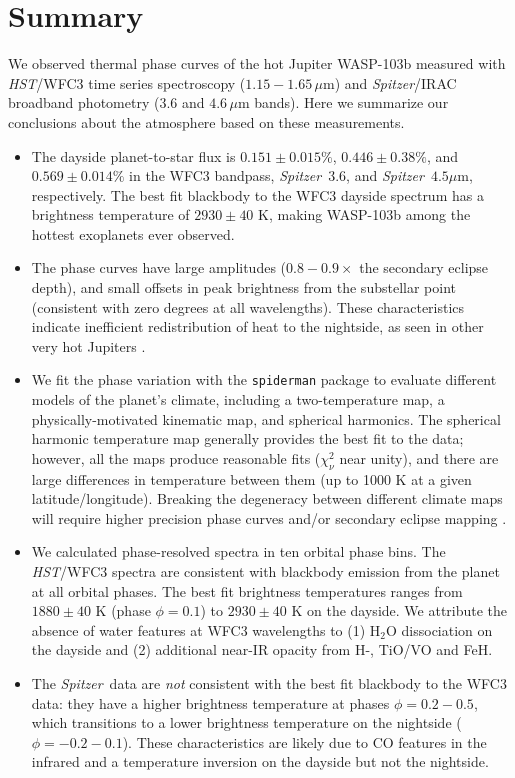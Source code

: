 \documentclass[twocolumn]{aastex61}
\newcommand{\project}[1]{\textsl{#1}}
\newcommand{\HST}{\project{HST}}
\newcommand{\Spitzer}{\project{Spitzer}}
\begin{document}
\section{Summary}
\label{sec:summary}
We observed thermal phase curves of the hot Jupiter WASP-103b measured with \HST/WFC3 time series spectroscopy ($1.15 - 1.65\,\mu$m) and \Spitzer/IRAC broadband photometry ($3.6$ and $4.6\,\mu$m bands). Here we summarize our conclusions about the atmosphere based on these measurements.

\begin{itemize}
	\item{The dayside planet-to-star flux is $0.151\pm0.015\%$, $0.446\pm0.38\%$, and $0.569\pm0.014\%$ in the WFC3 bandpass, \Spitzer\ $3.6$, and \Spitzer\ $4.5\mu$m, respectively.  The best fit blackbody to the WFC3 dayside spectrum has a brightness temperature of $2930 \pm 40$ K, making WASP-103b among the hottest exoplanets ever observed.}
	\item{The phase curves have large amplitudes ($0.8 -0.9\times$ the secondary eclipse depth), and small offsets in peak brightness from the substellar point (consistent with zero degrees at all wavelengths). These characteristics indicate inefficient redistribution of heat to the nightside, as seen in other very hot Jupiters \citep{komacek17}.} 
	\item{We fit the phase variation with the \texttt{spiderman} package \citep{louden17} to evaluate different models of the planet's climate, including a two-temperature map, a physically-motivated kinematic map, and spherical harmonics. The spherical harmonic temperature map generally provides the best fit to the data; however, all the maps produce reasonable fits ($\chi^2_\nu$ near unity), and there are large differences in temperature between them (up to 1000 K at a given latitude/longitude). Breaking the degeneracy between different climate maps will require higher precision phase curves and/or secondary eclipse mapping \citep[e.g.][]{dewit12}.}
\item{We calculated phase-resolved spectra in ten orbital phase bins. The \HST/WFC3 spectra are consistent with  blackbody emission from the planet at all orbital phases. The best fit brightness temperatures ranges from $1880\pm40$ K (phase $\phi = 0.1$) to $2930\pm40$ K on the dayside. We attribute the absence of water features at WFC3 wavelengths to (1) H$_2$O dissociation on the dayside and (2) additional near-IR opacity from H-, TiO/VO and FeH.}
\item{The \Spitzer\ data are \emph{not} consistent with the best fit blackbody to the WFC3 data: they have a higher brightness temperature at phases $\phi = 0.2 - 0.5$, which transitions to a lower brightness temperature on the nightside ($\phi = -0.2 - 0.1$). These characteristics are likely due to CO features in the infrared and a temperature inversion on the dayside but not the nightside.}

\end{itemize}
\end{document}

